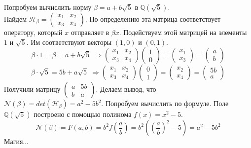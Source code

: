 \documentclass[oneside,final,14pt]{extreport}
\theoremstyle{plain}
\begin{document}
\begin{remark*}
Попробуем вычислить норму $\beta=a+b\sqrt{5}$ в $\mathbb{Q}(\sqrt{5})$.\\
Найдем $\mathcal{H}_{\beta}=\begin{pmatrix} x_1 & x_2 \\ x_3 & x_4 \end{pmatrix}$.
По определению эта матрица соответствует оператору, который $x$ отправляет в $\beta x$. Подействуем этой матрицей на элементы $1$ и $\sqrt{5}$. Им соответствуют векторы $(1,0)$ и $(0,1)$.
$$\beta \cdot 1=\beta=a+b\sqrt{5} \; \Rightarrow 
\begin{pmatrix} x_1 & x_2 \\ x_3 & x_4 \end{pmatrix}
\begin{pmatrix} 1 \\ 0\end{pmatrix}=
\begin{pmatrix} x_1 \\ x_3\end{pmatrix}=
\begin{pmatrix} a \\ b\end{pmatrix}$$
$$
\beta \cdot \sqrt{5}=5b+a\sqrt{5} \; \Rightarrow 
\begin{pmatrix} x_1 & x_2 \\ x_3 & x_4 \end{pmatrix}
\begin{pmatrix} 0 \\ 1\end{pmatrix}=
\begin{pmatrix} x_2 \\ x_4\end{pmatrix}=
\begin{pmatrix} 5b \\ a\end{pmatrix}
$$
Получили матрицу $\begin{pmatrix} a & 5b \\ b & a \end{pmatrix}$. Делаем вывод, что $\mathcal{N}(\beta)=det(\mathcal{H}_{\beta})=a^2-5b^2$.
Попробуем вычислить по формуле. Поле $\mathbb{Q}(\sqrt{5})$ построено с помощью полинома $f(x)=x^2-5$.
$$\mathcal{N}(\beta)=F(a,b) = b^2f(\frac{a}{b})=b^2 ((\frac{a}{b})^2-5)=a^2-5b^2$$
Магия...
\end{remark*}
\end{document}
